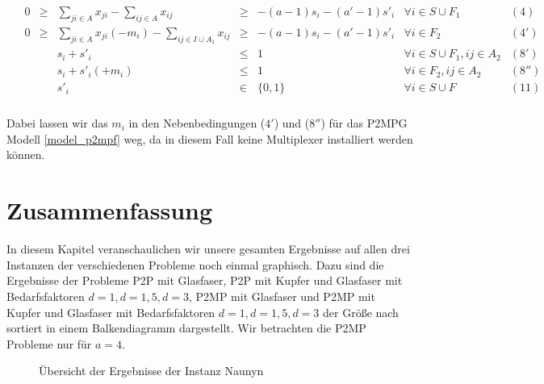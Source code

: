 \documentclass[11pt,a4paper]{article}
\theoremstyle{my_th_style1}
\begin{document}
  \begin{align*}
  \begin{array}{rcrcrcll}
  &0&\geq&\displaystyle\sum_{ji \in A} x_{ji} - \displaystyle\sum_{ij \in A} x_{ij}&\geq& -(a-1)s_i -(a'-1)s'_i & \forall i \in S \cup F_1& (4)\\
  &0&\geq&\displaystyle\sum_{ji \in A} x_{ji} (-m_i) - \displaystyle\sum_{ij \in I \cup A_1} x_{ij}&\geq& -(a-1)s_i -(a'-1)s'_i & \forall i \in F_2& (4')\\
    &&&s_i+s'_i & \leq &1 & \forall i \in S \cup F_1,ij\in A_2& (8')\\
  &&&s_i+s'_i(+m_i) & \leq &1 & \forall i \in F_2,ij\in A_2 &   (8'')\\
  &&& s'_i & \in & \{ 0,1 \} & \forall i \in S \cup F & (11) \\
  \end{array}
  \end{align*}

Dabei lassen wir das \(m_i\) in den Nebenbedingungen (\(4'\)) und (\(8''\)) f\"ur das P2MPG Modell \eqref{model_p2mpf} weg, da in diesem Fall keine Multiplexer installiert werden k\"onnen.
 
 \section{Zusammenfassung}
In diesem Kapitel veranschaulichen wir unsere gesamten Ergebnisse auf allen drei Instanzen der verschiedenen Probleme noch einmal graphisch. Dazu sind die Ergebnisse der Probleme P2P mit Glasfaser, P2P mit Kupfer und Glasfaser mit Bedarfsfaktoren $d=1, d=1,5, d=3$, P2MP mit Glasfaser und P2MP mit Kupfer und Glasfaser mit Bedarfsfaktoren $d=1, d=1,5, d=3$ der Größe nach sortiert in einem Balkendiagramm dargestellt. Wir betrachten die P2MP Probleme nur für $a=4$.

  \begin{figure}[!htbp]
 	\caption{\"Ubersicht der Ergebnisse der Instanz Naunyn}
 \end{figure}
 
\end{document}
